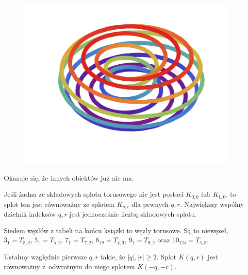 \begin{figure}[H]
\begin{minipage}[b]{.3\linewidth}
        \centering
        \includegraphics[width=\linewidth]{../data/torus-p11-q2.pdf}
    \end{minipage}
\end{figure}

Okazuje się, że innych obiektów już nie ma.

\begin{proposition}
    Jeśli żadna ze składowych splotu torusowego nie jest postaci $K_{0, 0}$ lub $K_{1, 0}$, to splot ten jest równoważny ze splotem $K_{q, r}$ dla pewnych $q, r$.
    Największy wspólny dzielnik indeksów $q, r$ jest jednocześnie liczbą składowych splotu.
\end{proposition}


Siedem węzłów z tabeli na końcu książki to węzły torusowe.
Są to niewęzeł, $3_1 = T_{3,2}$, $5_1 = T_{5,2}$, $7_1 = T_{7,2}$, $8_{19} = T_{4,3}$, $9_1 = T_{9,2}$ oraz $10_{124} = T_{5, 3}$.

\begin{proposition}
    Ustalmy względnie pierwsze $q, r$ takie, że $|q|, |r| \ge 2$.
    Splot $K(q, r)$ jest równoważny z~odwrotnym do niego splotem $K(-q, -r)$.
\end{proposition}

